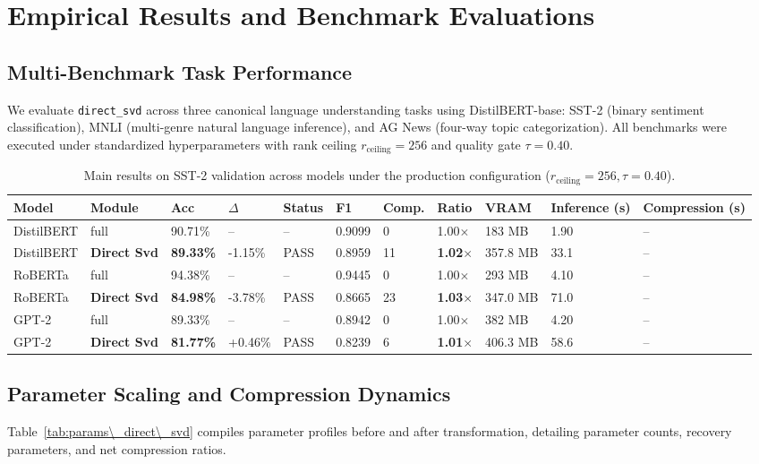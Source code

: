\section{Empirical Results and Benchmark Evaluations}
\label{sec:results}

\subsection{Multi-Benchmark Task Performance}
We evaluate \texttt{direct\_svd} across three canonical language understanding tasks using DistilBERT-base: SST-2 (binary sentiment classification), MNLI (multi-genre natural language inference), and AG News (four-way topic categorization). All benchmarks were executed under standardized hyperparameters with rank ceiling $r_{\mathrm{ceiling}} = 256$ and quality gate $\tau = 0.40$.

\begin{table}[t]
\centering
\small
\begin{tabular}{lllllllllll}
\toprule
\textbf{Model} & \textbf{Module} & \textbf{Acc} & \textbf{$\Delta$} & \textbf{Status} & \textbf{F1} & \textbf{Comp.} & \textbf{Ratio} & \textbf{VRAM} & \textbf{Inference (s)} & \textbf{Compression (s)} \\
\midrule
DistilBERT & full & 90.71\% & -- & -- & 0.9099 & 0 & 1.00$\times$ & 183 MB & 1.90 & -- \\
DistilBERT & \textbf{Direct Svd} & \textbf{89.33\%} & -1.15\% & PASS & 0.8959 & 11 & \textbf{1.02$\times$} & 357.8 MB & 33.1 & -- \\
RoBERTa & full & 94.38\% & -- & -- & 0.9445 & 0 & 1.00$\times$ & 293 MB & 4.10 & -- \\
RoBERTa & \textbf{Direct Svd} & \textbf{84.98\%} & -3.78\% & PASS & 0.8665 & 23 & \textbf{1.03$\times$} & 347.0 MB & 71.0 & -- \\
GPT-2 & full & 89.33\% & -- & -- & 0.8942 & 0 & 1.00$\times$ & 382 MB & 4.20 & -- \\
GPT-2 & \textbf{Direct Svd} & \textbf{81.77\%} & +0.46\% & PASS & 0.8239 & 6 & \textbf{1.01$\times$} & 406.3 MB & 58.6 & -- \\
\bottomrule
\end{tabular}
\caption{Main results on SST-2 validation across models under the production configuration ($r_{\mathrm{ceiling}}=256, \tau=0.40$).}
\label{tab:main\_sst2}
\end{table}

\subsection{Parameter Scaling and Compression Dynamics}
Table~\ref{tab:params\_direct\_svd} compiles parameter profiles before and after transformation, detailing parameter counts, recovery parameters, and net compression ratios.


